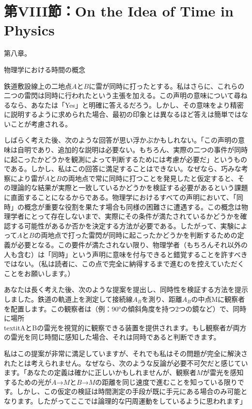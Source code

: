 \documentclass[a4paper,11pt,openany]{ltjsbook}
\begin{document}
\clearpage
\chapter{第VIII節：On the Idea of Time in Physics}

第八章。

物理学における時間の概念

鉄道敷設線上の二地点$A$と$B$に雷が同時に打ったとする。私はさらに、これらの二つの雷閃は同時に行われたという主張を加える。この声明の意味について尋ねるなら、あなたは「Yes」と明確に答えるだろう。しかし、その意味をより精密に説明するように求められた場合、最初の印象とは異なるほど答えは簡単ではないことが考慮される。

しばらく考えた後、次のような回答が思い浮かぶかもしれない。「この声明の意味は自明であり、追加的な説明は必要ない。もちろん、実際の二つの事件が同時に起こったかどうかを観測によって判断するためには考慮が必要だ」というものである。しかし、私はこの回答に満足することはできない。なぜなら、巧みな考察により雷が$A$と$B$の両地点で常に同時に打つことを発見したと仮定すると、その理論的な結果が実際と一致しているかどうかを検証する必要があるという課題に直面することになるからである。物理学におけるすべての声明において、「同時」の概念が重要な役割を果たす場合も同様の困難さに遭遇する。この概念は物理学者にとって存在しないまで、実際にその条件が満たされているかどうかを確認する可能性があるか否かを決定する方法が必要である。したがって、実験によって$A$と$B$の両地点で打った雷閃が同時に起こったかどうかを判断するための定義が必要となる。この要件が満たされない限り、物理学者（もちろんそれ以外の人も含む）は「同時」という声明に意味を付与できると錯覚することを許すべきではない。（私は読者に、この点で完全に納得するまで進むのを控えていただくことをお願いします。）

あなたは長く考えた後、次のような提案を提出し、同時性を検証する方法を提示しました。鉄道の軌道上を測定して接続線$A_{B}$を測り、距離$A_{B}$の中点Mに観察者を配置します。この観察者は（例：90°の傾斜角度を持つ2つの鏡など）で、同時に場所\\textit{Aと}Bの雷光を視覚的に観察できる装置を提供されます。もし観察者が両方の雷光を同じ時間に感知した場合、それは同時であると判断できます。

私はこの提案が非常に満足していますが、それでも私はその問題が完全に解決されたとは考えられません。なぜなら、次のような反論が必要不可欠だと感じています。「あなたの定義は確かに正しいかもしれませんが、観察者$M$が雷光を感知するための光が$A$→$M$と$B$→$M$の距離を同じ速度で進むことを知っている限りです。しかし、この仮定の検証は時間測定の手段が既に手元にある場合のみ可能となります。したがってここでは論理的な円周運動をしているように思われます」
\end{document}
